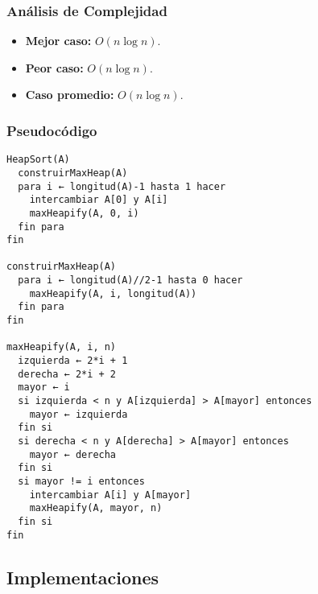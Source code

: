 \documentclass[11pt,openany]{book}
\begin{document}
\subsubsection{Análisis de Complejidad}
\begin{itemize}
    \item \textbf{Mejor caso:} $O(n \log n)$.
    \item \textbf{Peor caso:} $O(n \log n)$.
    \item \textbf{Caso promedio:} $O(n \log n)$.
\end{itemize}

\subsubsection{Pseudocódigo}
\begin{verbatim}
HeapSort(A)
  construirMaxHeap(A)
  para i ← longitud(A)-1 hasta 1 hacer
    intercambiar A[0] y A[i]
    maxHeapify(A, 0, i)
  fin para
fin

construirMaxHeap(A)
  para i ← longitud(A)//2-1 hasta 0 hacer
    maxHeapify(A, i, longitud(A))
  fin para
fin

maxHeapify(A, i, n)
  izquierda ← 2*i + 1
  derecha ← 2*i + 2
  mayor ← i
  si izquierda < n y A[izquierda] > A[mayor] entonces
    mayor ← izquierda
  fin si
  si derecha < n y A[derecha] > A[mayor] entonces
    mayor ← derecha
  fin si
  si mayor != i entonces
    intercambiar A[i] y A[mayor]
    maxHeapify(A, mayor, n)
  fin si
fin
\end{verbatim}

\subsection{Implementaciones}
\end{document}

